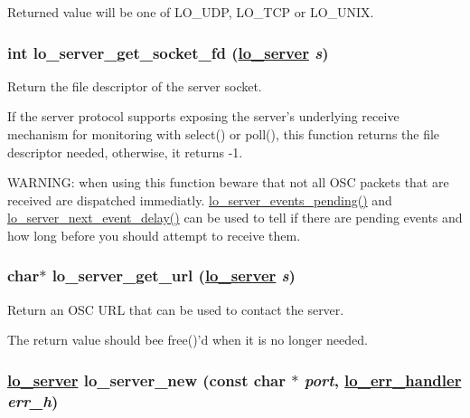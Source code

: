 Returned value will be one of LO\_\-UDP, LO\_\-TCP or LO\_\-UNIX. \hypertarget{group__liblolowlevel_ge11ca5a5b4ec2943d5a04642ba5052ae}{
\subsubsection[lo\_\-server\_\-get\_\-socket\_\-fd]{\setlength{\rightskip}{0pt plus 5cm}int lo\_\-server\_\-get\_\-socket\_\-fd (\hyperlink{lo__types_8h_59067bf50cf8abb4371da6f03c9036c9}{lo\_\-server} {\em s})}}
\label{group__liblolowlevel_ge11ca5a5b4ec2943d5a04642ba5052ae}


Return the file descriptor of the server socket. 

If the server protocol supports exposing the server's underlying receive mechanism for monitoring with select() or poll(), this function returns the file descriptor needed, otherwise, it returns -1.

WARNING: when using this function beware that not all OSC packets that are received are dispatched immediatly. \hyperlink{group__liblolowlevel_g04feb1063c3f4df6fec41405b28dd99a}{lo\_\-server\_\-events\_\-pending()} and \hyperlink{group__liblolowlevel_g750076fdd75e2a7d3e442f6bd5968fb9}{lo\_\-server\_\-next\_\-event\_\-delay()} can be used to tell if there are pending events and how long before you should attempt to receive them. \hypertarget{group__liblolowlevel_g33df48c641833d330a8ba6704caf4977}{
\subsubsection[lo\_\-server\_\-get\_\-url]{\setlength{\rightskip}{0pt plus 5cm}char$\ast$ lo\_\-server\_\-get\_\-url (\hyperlink{lo__types_8h_59067bf50cf8abb4371da6f03c9036c9}{lo\_\-server} {\em s})}}
\label{group__liblolowlevel_g33df48c641833d330a8ba6704caf4977}


Return an OSC URL that can be used to contact the server. 

The return value should bee free()'d when it is no longer needed. \hypertarget{group__liblolowlevel_g78cfb23346e44465695293d4393447ae}{
\subsubsection[lo\_\-server\_\-new]{\setlength{\rightskip}{0pt plus 5cm}\hyperlink{lo__types_8h_59067bf50cf8abb4371da6f03c9036c9}{lo\_\-server} lo\_\-server\_\-new (const char $\ast$ {\em port}, \hyperlink{lo__types_8h_6663024c5970f397af12afdb906ab9bd}{lo\_\-err\_\-handler} {\em err\_\-h})}}
\label{group__liblolowlevel_g78cfb23346e44465695293d4393447ae}


